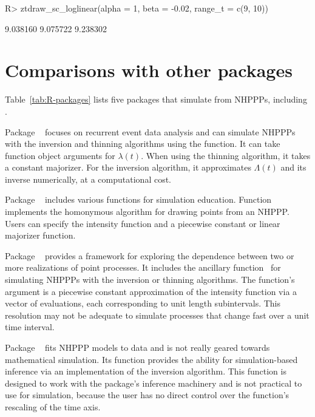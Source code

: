 \documentclass[article]{jss}\usepackage[]{graphicx}\usepackage[]{xcolor}
\newcommand{\fct}[1]{\code{#1()}}
\begin{document}
\begin{Schunk}
\begin{Sinput}
R> ztdraw_sc_loglinear(alpha = 1, beta = -0.02, range_t = c(9, 10))
\end{Sinput}
\begin{Soutput}
[1] 9.038160 9.075722 9.238302
\end{Soutput}
\end{Schunk}


\section[Comparisons with other R packages]{Comparisons with other  packages}\label{sec:other-R-packages}

Table~\ref{tab:R-packages} lists five  packages that simulate from NHPPPs, including .

Package ~\citep{reda-package} focuses on recurrent event data analysis and can simulate NHPPPs with the inversion and thinning algorithms using the \fct{simEvent} function. It can take function object arguments for $\lambda(t)$. When using the thinning algorithm, it takes a constant majorizer. For the inversion algorithm, it approximates $\Lambda(t)$ and its inverse numerically, at a computational cost.

Package ~\citep{simEd-package} includes various functions for simulation education. Function \fct{thinning} implements the homonymous algorithm for drawing points from an NHPPP. Users can specify the intensity function and a piecewise constant or linear majorizer function.

Package ~\citep{IndTestPP-package} provides a framework for exploring the dependence between two or more realizations of point processes. It includes the ancillary function~\fct{simNHPc} for simulating NHPPPs with the inversion or thinning algorithms. The function's argument is a piecewise constant approximation of the intensity function via a vector of evaluations, each corresponding to unit length subintervals. This resolution may not be adequate to simulate processes that change fast over a unit time interval.

Package ~\citep{NHPoisson-jss, NHPoisson-package} fits NHPPP models to data and is not really geared towards mathematical simulation. Its \fct{simNHP.fun} function provides the ability for simulation-based inference via an implementation of the inversion algorithm. This function is designed to work with the package's inference machinery and is not practical to use for simulation, because the user has no direct control over the function's rescaling of the time axis.
\end{document}
